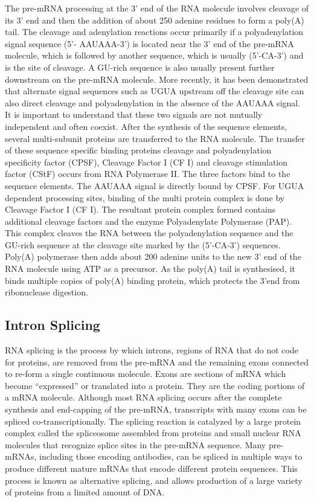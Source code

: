 The pre-mRNA processing at the 3' end of the RNA molecule involves cleavage of its 3' end and then the addition of about 250 adenine residues to form a poly(A) tail. The cleavage and adenylation reactions occur primarily if a polyadenylation signal sequence (5'- AAUAAA-3') is located near the 3' end of the pre-mRNA molecule, which is followed by another sequence, which is usually (5'-CA-3') and is the site of cleavage. A GU-rich sequence is also usually present further downstream on the pre-mRNA molecule. More recently, it has been demonstrated that alternate signal sequences such as UGUA upstream off the cleavage site can also direct cleavage and polyadenylation in the absence of the AAUAAA signal. It is important to understand that these two signals are not mutually independent and often coexist. After the synthesis of the sequence elements, several multi-subunit proteins are transferred to the RNA molecule. The transfer of these sequence specific binding proteins cleavage and polyadenylation specificity factor (CPSF), Cleavage Factor I (CF I) and cleavage stimulation factor (CStF) occurs from RNA Polymerase II. The three factors bind to the sequence elements. The AAUAAA signal is directly bound by CPSF. For UGUA dependent processing sites, binding of the multi protein complex is done by Cleavage Factor I (CF I). The resultant protein complex formed contains additional cleavage factors and the enzyme Polyadenylate Polymerase (PAP). This complex cleaves the RNA between the polyadenylation sequence and the GU-rich sequence at the cleavage site marked by the (5'-CA-3') sequences. Poly(A) polymerase then adds about 200 adenine units to the new 3' end of the RNA molecule using ATP as a precursor. As the poly(A) tail is synthesised, it binds multiple copies of poly(A) binding protein, which protects the 3'end from ribonuclease digestion.

\hypertarget{intron-splicing}{%
\subsection{Intron Splicing}\label{intron-splicing}}

RNA splicing is the process by which introns, regions of RNA that do not code for proteins, are removed from the pre-mRNA and the remaining exons connected to re-form a single continuous molecule. Exons are sections of mRNA which become ``expressed'' or translated into a protein. They are the coding portions of a mRNA molecule. Although most RNA splicing occurs after the complete synthesis and end-capping of the pre-mRNA, transcripts with many exons can be spliced co-transcriptionally. The splicing reaction is catalyzed by a large protein complex called the spliceosome assembled from proteins and small nuclear RNA molecules that recognize splice sites in the pre-mRNA sequence. Many pre-mRNAs, including those encoding antibodies, can be spliced in multiple ways to produce different mature mRNAs that encode different protein sequences. This process is known as alternative splicing, and allows production of a large variety of proteins from a limited amount of DNA.

